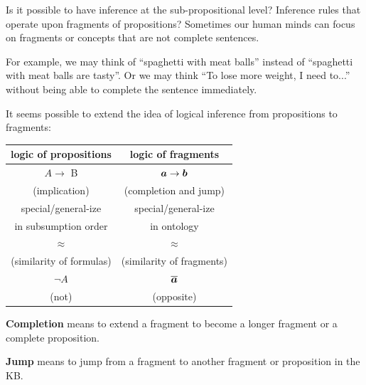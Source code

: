 Is it possible to have inference at the sub-propositional level?  Inference rules that operate upon fragments of propositions?  Sometimes our human minds can focus on fragments or concepts that are not complete sentences.

For example, we may think of ``spaghetti with meat balls'' instead of ``spaghetti with meat balls are tasty''.  Or we may think ``To lose more weight, I need to...'' without being able to complete the sentence immediately.

It seems possible to extend the idea of logical inference from propositions to fragments:

\begin{center}
\begin{tabular}{|c|c|}
\hline
\textbf{logic of propositions}   & \textbf{logic of fragments} \\
\hline
$A \rightarrow$ B                     & $\mbox{\boldmath$a$} \rightarrow \mbox{\boldmath$b$} $ \\
(implication)                              & (completion and jump) \\
\hline
special/general-ize                    & special/general-ize \\
in subsumption order               & in ontology \\
\hline
$\approx$                                  &  $\approx$ \\
(similarity of formulas)             &  (similarity of fragments) \\
\hline
$\neg A$                                   &  $\overline{\mbox{\boldmath$a$}}$ \\
(not)                                           & (opposite) \\
\hline
\end{tabular}
\end{center}
\vspace{0.5cm}

\textbf{Completion} means to extend a fragment to become a longer fragment or a complete proposition.

\textbf{Jump} means to jump from a fragment to another fragment or proposition in the KB.

